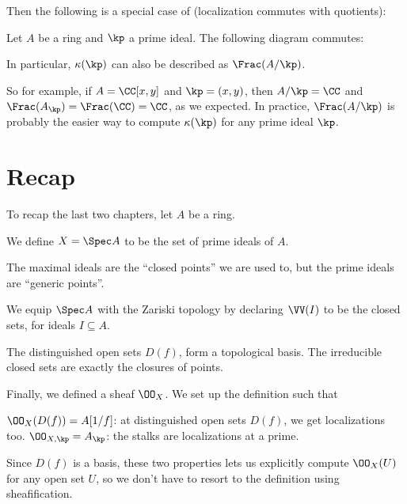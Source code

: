 Then the following is a special case of
(localization commutes with quotients):
\begin{theorem}
	Let $A$ be a ring and $\kp$ a prime ideal.
	The following diagram commutes:
	\begin{center}
	\end{center}
	In particular, $\kappa(\kp)$
	can also be described as $\Frac(A/\kp)$.
\end{theorem}
So for example, if $A = \CC[x,y]$ and $\kp = (x,y)$,
then $A/\kp = \CC$ and $\Frac(A_\kp) = \Frac(\CC) = \CC$, as we expected.
In practice, $\Frac(A/\kp)$ is probably the easier way
to compute $\kappa(\kp)$ for any prime ideal $\kp$.



\section{Recap}
To recap the last two chapters, let $A$ be a ring.
\begin{itemize}
	\ii We define $X = \Spec A$ to be the set of prime ideals of $A$.
	\begin{itemize}
		\ii The maximal ideals are the ``closed points'' we are used to,
		but the prime ideals are ``generic points''.
	\end{itemize}

	\ii We equip $\Spec A$ with the Zariski topology by declaring
	$\VV(I)$ to be the closed sets, for ideals $I \subseteq A$.
	\begin{itemize}
		\ii The distinguished open sets $D(f)$,
		form a topological basis.
		\ii The irreducible closed sets are exactly the closures of points.
	\end{itemize}

	\ii Finally, we defined a sheaf $\OO_X$.
	We set up the definition such that
	\begin{itemize}
		\ii $\OO_{X}(D(f)) = A[1/f]$:
		at distinguished open sets $D(f)$,
		we get localizations too.
		\ii $\OO_{X,\kp} = A_\kp$:
		the stalks are localizations at a prime.
	\end{itemize}
	Since $D(f)$ is a basis,
	these two properties lets us explicitly compute $\OO_X(U)$
	for any open set $U$,
	so we don't have to resort to the definition using sheafification.
\end{itemize}


